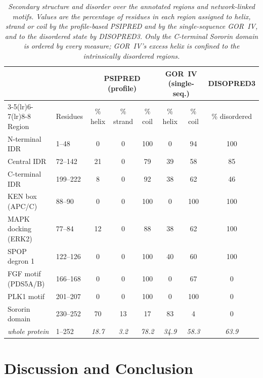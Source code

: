 \documentclass[11pt]{article}
\begin{document}
\begin{table}[htbp]
\centering
\caption{\textit{Secondary structure and disorder over the annotated regions and network-linked motifs. Values are the percentage of residues in each region assigned to helix, strand or coil by the profile-based PSIPRED and by the single-sequence GOR~IV, and to the disordered state by DISOPRED3. Only the C-terminal Sororin domain is ordered by every measure; GOR~IV's excess helix is confined to the intrinsically disordered regions.}}
\label{tab:ss}
\small
\begin{tabular}{llcccccc}
\toprule
 & & \multicolumn{3}{c}{PSIPRED (profile)} & \multicolumn{2}{c}{GOR~IV (single-seq.)} & DISOPRED3 \\
\cmidrule(lr){3-5}\cmidrule(lr){6-7}\cmidrule(lr){8-8}
Region & Residues & \% helix & \% strand & \% coil & \% helix & \% coil & \% disordered \\
\midrule
N-terminal IDR & 1--48 & 0 & 0 & 100 & 0 & 94 & 100 \\
Central IDR & 72--142 & 21 & 0 & 79 & 39 & 58 & 85 \\
C-terminal IDR & 199--222 & 8 & 0 & 92 & 38 & 62 & 46 \\
KEN box (APC/C) & 88--90 & 0 & 0 & 100 & 0 & 100 & 100 \\
MAPK docking (ERK2) & 77--84 & 12 & 0 & 88 & 38 & 62 & 100 \\
SPOP degron 1 & 122--126 & 0 & 0 & 100 & 40 & 60 & 100 \\
FGF motif (PDS5A/B) & 166--168 & 0 & 0 & 100 & 0 & 67 & 0 \\
PLK1 motif & 201--207 & 0 & 0 & 100 & 0 & 100 & 0 \\
Sororin domain & 230--252 & 70 & 13 & 17 & 83 & 4 & 0 \\
\midrule
\textit{whole protein} & 1--252 & \textit{18.7} & \textit{3.2} & \textit{78.2} & \textit{34.9} & \textit{58.3} & \textit{63.9} \\
\bottomrule
\end{tabular}
\end{table}

\FloatBarrier
\section{Discussion and Conclusion}
\end{document}
